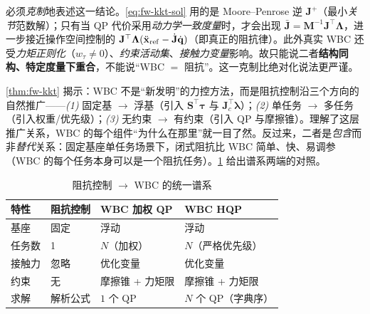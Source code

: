 \begin{remark}
\label{rmk:fw-not-equiv}
必须\emph{克制}地表述这一结论。\cref{eq:fw-kkt-sol} 用的是 Moore--Penrose 逆 $\mathbf{J}^+$（最小\emph{关节}范数解）；只有当 QP 代价采用\emph{动力学一致度量}时，才会出现 $\bar{\mathbf{J}}=\mathbf{M}^{-1}\mathbf{J}^\top\boldsymbol{\Lambda}$，进一步接近操作空间控制的 $\mathbf{J}^\top\boldsymbol{\Lambda}(\ddot{\mathbf{x}}_{\rm ref}-\dot{\mathbf{J}}\dot{\mathbf{q}})$（即真正的阻抗律）。此外真实 WBC 还受\emph{力矩正则化}（$w_\tau\neq0$）、\emph{约束活动集}、\emph{接触力变量}影响。故只能说二者\textbf{结构同构、特定度量下重合}，不能说“WBC $=$ 阻抗”。这一克制比绝对化说法更严谨。
\end{remark}

\begin{insight}
\label{ins:fw-generalization}
\cref{thm:fw-kkt} 揭示：WBC 不是“新发明”的力控方法，而是阻抗控制沿三个方向的自然推广——\emph{(1)} 固定基 $\to$ 浮基（引入 $\mathbf{S}^\top\boldsymbol{\tau}$ 与 $\mathbf{J}_c^\top\boldsymbol{\lambda}$）；\emph{(2)} 单任务 $\to$ 多任务（引入权重/优先级）；\emph{(3)} 无约束 $\to$ 有约束（引入 QP 与摩擦锥）。理解了这层推广关系，WBC 的每个组件“为什么在那里”就一目了然。反过来，二者是\emph{包含}而非\emph{替代}关系：固定基座单任务场景下，闭式阻抗比 WBC 简单、快、易调参（WBC 的每个任务本身可以是一个阻抗任务）。\cref{tab:fw-unify} 给出谱系两端的对照。
\end{insight}

\begin{table}[H]\centering\small
\caption{阻抗控制 $\to$ WBC 的统一谱系}
\label{tab:fw-unify}
\begin{tabular}{llll}
\toprule
特性 & 阻抗控制 & WBC 加权 QP & WBC HQP \\
\midrule
基座 & 固定 & 浮动 & 浮动 \\
任务数 & 1 & $N$（加权） & $N$（严格优先级） \\
接触力 & 忽略 & 优化变量 & 优化变量 \\
约束 & 无 & 摩擦锥 + 力矩限 & 摩擦锥 + 力矩限 \\
求解 & 解析公式 & $1$ 个 QP & $N$ 个 QP（字典序） \\
\bottomrule
\end{tabular}
\end{table}

